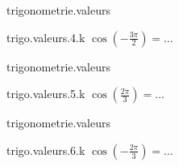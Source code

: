 \begin{qcm}{trigonometrie.valeurs}
    \begin{question}{trigo.valeurs.4.k}
         \({\cos\left(-\frac{3\pi}{2}\right)}=\ldots\)
         \vspace{-1.5ex}
         \begin{multicols}{3}
            \begin{reponses}
                \lastchoices
            \end{reponses}
        \end{multicols}
    \end{question}
\end{qcm}

\begin{qcm}{trigonometrie.valeurs}
    \begin{question}{trigo.valeurs.5.k}
         \({\cos\left(\frac{2\pi}{3}\right)}=\ldots\)
         \vspace{-1.5ex}
         \begin{multicols}{3}
            \begin{reponses}
                \lastchoices
            \end{reponses}
        \end{multicols}
    \end{question}
\end{qcm}

\begin{qcm}{trigonometrie.valeurs}
    \begin{question}{trigo.valeurs.6.k}
         \({\cos\left(-\frac{2\pi}{3}\right)}=\ldots\)
         \vspace{-1.5ex}
         \begin{multicols}{3}
            \begin{reponses}
                \lastchoices
            \end{reponses}
        \end{multicols}
    \end{question}
\end{qcm}

